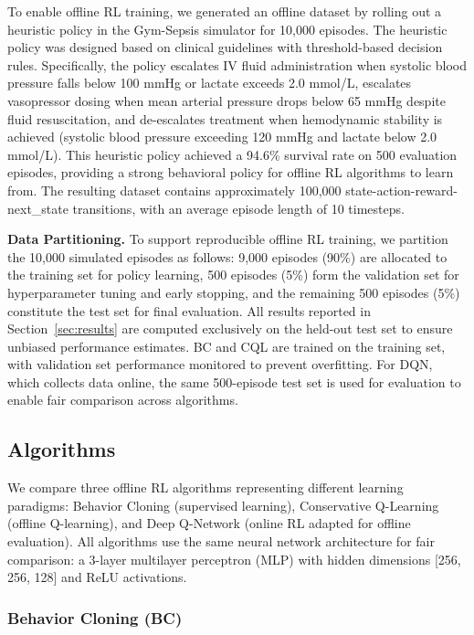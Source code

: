 To enable offline RL training, we generated an offline dataset by rolling out a heuristic policy in the Gym-Sepsis simulator for 10,000 episodes. The heuristic policy was designed based on clinical guidelines \citep{rhodes2017ssc, seymour2017sepsis_criteria} with threshold-based decision rules. Specifically, the policy escalates IV fluid administration when systolic blood pressure falls below 100 mmHg or lactate exceeds 2.0 mmol/L, escalates vasopressor dosing when mean arterial pressure drops below 65 mmHg despite fluid resuscitation, and de-escalates treatment when hemodynamic stability is achieved (systolic blood pressure exceeding 120 mmHg and lactate below 2.0 mmol/L). This heuristic policy achieved a 94.6\% survival rate on 500 evaluation episodes, providing a strong behavioral policy for offline RL algorithms to learn from. The resulting dataset contains approximately 100,000 state-action-reward-next\_state transitions, with an average episode length of 10 timesteps.

\textbf{Data Partitioning.} To support reproducible offline RL training, we partition the 10,000 simulated episodes as follows: 9,000 episodes (90\%) are allocated to the training set for policy learning, 500 episodes (5\%) form the validation set for hyperparameter tuning and early stopping, and the remaining 500 episodes (5\%) constitute the test set for final evaluation. All results reported in Section~\ref{sec:results} are computed exclusively on the held-out test set to ensure unbiased performance estimates. BC and CQL are trained on the training set, with validation set performance monitored to prevent overfitting. For DQN, which collects data online, the same 500-episode test set is used for evaluation to enable fair comparison across algorithms.

\subsection{Algorithms}\label{sec:methods:algos}

We compare three offline RL algorithms representing different learning paradigms: Behavior Cloning (supervised learning), Conservative Q-Learning (offline Q-learning), and Deep Q-Network (online RL adapted for offline evaluation). All algorithms use the same neural network architecture for fair comparison: a 3-layer multilayer perceptron (MLP) with hidden dimensions [256, 256, 128] and ReLU activations.

\subsubsection{Behavior Cloning (BC)}


